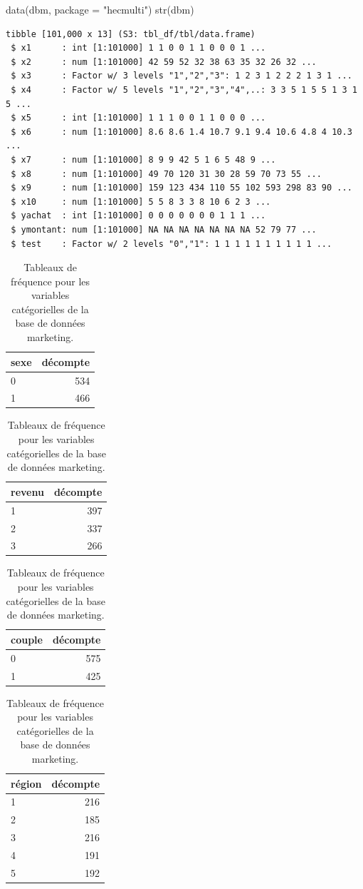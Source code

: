 \documentclass[
  11pt,
  letterpaper,
]{scrbook}
\newenvironment{Shaded}{\begin{snugshade}}{\end{snugshade}}
\newcommand{\AttributeTok}[1]{\textcolor[rgb]{0.40,0.45,0.13}{#1}}
\newcommand{\FunctionTok}[1]{\textcolor[rgb]{0.28,0.35,0.67}{#1}}
\newcommand{\NormalTok}[1]{\textcolor[rgb]{0.00,0.23,0.31}{#1}}
\newcommand{\StringTok}[1]{\textcolor[rgb]{0.13,0.47,0.30}{#1}}
\theoremstyle{definition}
\theoremstyle{remark}
\begin{document}
\begin{Shaded}
\begin{Highlighting}[]
\FunctionTok{data}\NormalTok{(dbm, }\AttributeTok{package =} \StringTok{"hecmulti"}\NormalTok{)}
\FunctionTok{str}\NormalTok{(dbm)}
\end{Highlighting}
\end{Shaded}

\begin{verbatim}
tibble [101,000 x 13] (S3: tbl_df/tbl/data.frame)
 $ x1      : int [1:101000] 1 1 0 0 1 1 0 0 0 1 ...
 $ x2      : num [1:101000] 42 59 52 32 38 63 35 32 26 32 ...
 $ x3      : Factor w/ 3 levels "1","2","3": 1 2 3 1 2 2 2 1 3 1 ...
 $ x4      : Factor w/ 5 levels "1","2","3","4",..: 3 3 5 1 5 5 1 3 1 5 ...
 $ x5      : int [1:101000] 1 1 1 0 0 1 1 0 0 0 ...
 $ x6      : num [1:101000] 8.6 8.6 1.4 10.7 9.1 9.4 10.6 4.8 4 10.3 ...
 $ x7      : num [1:101000] 8 9 9 42 5 1 6 5 48 9 ...
 $ x8      : num [1:101000] 49 70 120 31 30 28 59 70 73 55 ...
 $ x9      : num [1:101000] 159 123 434 110 55 102 593 298 83 90 ...
 $ x10     : num [1:101000] 5 5 8 3 3 8 10 6 2 3 ...
 $ yachat  : int [1:101000] 0 0 0 0 0 0 0 1 1 1 ...
 $ ymontant: num [1:101000] NA NA NA NA NA NA NA 52 79 77 ...
 $ test    : Factor w/ 2 levels "0","1": 1 1 1 1 1 1 1 1 1 1 ...
\end{verbatim}

\hypertarget{tbl-contingence-dbm}{}
\begin{table}
\caption{\label{tbl-contingence-dbm}Tableaux de fréquence pour les variables catégorielles de la base de
données marketing. }\tabularnewline


\begin{tabular}{lr}
\toprule
sexe & décompte\\
\midrule
0 & 534\\
1 & 466\\
\bottomrule
\end{tabular}
\begin{tabular}{lr}
\toprule
revenu & décompte\\
\midrule
1 & 397\\
2 & 337\\
3 & 266\\
\bottomrule
\end{tabular}
\begin{tabular}{lr}
\toprule
couple & décompte\\
\midrule
0 & 575\\
1 & 425\\
\bottomrule
\end{tabular}
\begin{tabular}{lr}
\toprule
région & décompte\\
\midrule
1 & 216\\
2 & 185\\
3 & 216\\
4 & 191\\
5 & 192\\
\bottomrule
\end{tabular}
\end{table}
\end{document}
